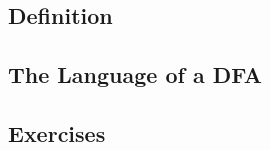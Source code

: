 

\subsection{Definition}

\subsection{The Language of a DFA}

\subsection{Exercises}\label{exer-dfa}


